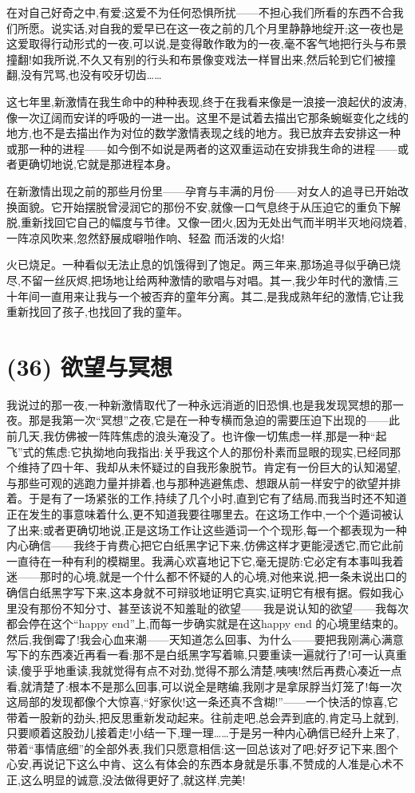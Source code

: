 在对自己好奇之中,有爱;这爱不为任何恐惧所扰——不担心我们所看的东西不合我们所愿。说实话,对自我的爱早已在这一夜之前的几个月里静静地绽开;这一夜也是这爱取得行动形式的一夜,可以说,是变得敢作敢为的一夜,毫不客气地把行头与布景撞翻!如我所说,不久又有别的行头和布景像变戏法一样冒出来,然后轮到它们被撞翻,没有咒骂,也没有咬牙切齿……

这七年里,新激情在我生命中的种种表现,终于在我看来像是一浪接一浪起伏的波涛,像一次辽阔而安详的呼吸的一进一出。这里不是试着去描出它那条蜿蜒变化之线的地方,也不是去描出作为对位的数学激情表现之线的地方。我已放弃去安排这一种或那一种的进程——如今倒不如说是两者的这双重运动在安排我生命的进程——或者更确切地说,它就是那进程本身。

在新激情出现之前的那些月份里——孕育与丰满的月份——对女人的追寻已开始改换面貌。它开始摆脱曾浸润它的那份不安,就像一口气息终于从压迫它的重负下解脱,重新找回它自己的幅度与节律。又像一团火,因为无处出气而半明半灭地闷烧着,一阵凉风吹来,忽然舒展成噼啪作响、轻盈%
而活泼的火焰!

火已烧足。一种看似无法止息的饥饿得到了饱足。两三年来,那场追寻似乎确已烧尽,不留一丝灰烬,把场地让给两种激情的歌唱与对唱。其一,我少年时代的激情,三十年间一直用来让我与一个被否弃的童年分离。其二,是我成熟年纪的激情,它让我重新找回了孩子,也找回了我的童年。

\section{(36) 欲望与冥想}

我说过的那一夜,一种新激情取代了一种永远消逝的旧恐惧,也是我发现冥想的那一夜。那是我第一次“冥想”之夜,它是在一种专横而急迫的需要压迫下出现的——此前几天,我仿佛被一阵阵焦虑的浪头淹没了。也许像一切焦虑一样,那是一种“起飞”式的焦虑:它执拗地向我指出:关乎我这个人的那份朴素而显眼的现实,已经同那个维持了四十年、我却从未怀疑过的自我形象脱节。肯定有一份巨大的认知渴望,与那些可观的逃跑力量并排着,也与那种逃避焦虑、想跟从前一样安宁的欲望并排着。于是有了一场紧张的工作,持续了几个小时,直到它有了结局,而我当时还不知道正在发生的事意味着什么,更不知道我要往哪里去。在这场工作中,一个个遁词被认了出来;或者更确切地说,正是这场工作让这些遁词一个个现形,每一个都表现为一种内心确信——我终于肯费心把它白纸黑字记下来,仿佛这样才更能浸透它,而它此前一直待在一种有利的模糊里。我满心欢喜地记下它,毫无提防:它必定有本事叫我着迷——那时的心境,就是一个什么都不怀疑的人的心境,对他来说,把一条未说出口的确信白纸黑字写下来,这本身就不可辩驳地证明它真实,证明它有根有据。假如我心里没有那份不知分寸、甚至该说不知羞耻的欲望——我是说认知的欲望——我每次都会停在这个“happy end”上,而每一步确实就是在这happy end 的心境里结束的。然后,我倒霉了!我会心血来潮——天知道怎么回事、为什么——要把我刚满心满意写下的东西凑近再看一看:那不是白纸黑字写着嘛,只要重读一遍就行了!可一认真重读,傻乎乎地重读,我就觉得有点不对劲,觉得不那么清楚,咦咦!然后再费心凑近一点看,就清楚了:根本不是那么回事,可以说全是瞎编,我刚才是拿尿脬当灯笼了!每一次这局部的发现都像个大惊喜,“好家伙!这一条还真不含糊!”——一个快活的惊喜,它带着一股新的劲头,把反思重新发动起来。往前走吧,总会弄到底的,肯定马上就到,只要顺着这股劲儿接着走!小结一下,理一理……于是另一种内心确信已经升上来了,带着“事情底细”的全部外表,我们只愿意相信:这一回总该对了吧;好歹记下来,图个心安,再说记下这么中肯、这么有体会的东西本身就是乐事,不赞成的人准是心术不正,这么明显的诚意,没法做得更好了,就这样,完美!


